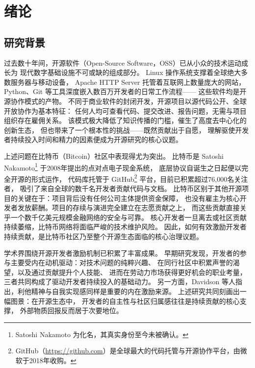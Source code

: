 \documentclass[
    type = master, %
    degree = professional,        %
    decl-page,  %
    twoside,                %
    fontset = fandol %
  ]{njuthesis}
\begin{document}
\tableofcontents
\listoffigures
\listoftables

\mainmatter

\chapter{绪论}

\section{研究背景}

过去数十年间，开源软件（Open-Source Software，OSS）已从小众的技术运动成长为
现代数字基础设施不可或缺的组成部分\cite{lerner2002simple,chen2021opensource}。
Linux 操作系统支撑着全球绝大多数服务器与移动设备，
Apache HTTP Server 托管着互联网上数量庞大的网站，
Python、Git 等工具深度嵌入数百万开发者的日常工作流程——
这些软件均是开源协作模式的产物\cite{lakhani2003open}。
不同于商业软件的封闭开发，开源项目以源代码公开、全球开放协作为基本特征：
任何人均可查看代码、提交改进、报告问题，无需与项目组织存在雇佣关系。
该模式极大降低了知识传播的门槛，催生了高度去中心化的创新生态，
但也带来了一个根本性的挑战——既然贡献出于自愿，
理解驱使开发者持续投入时间和精力的因素便成为开源研究的核心议题。

上述问题在比特币（Bitcoin）社区中表现得尤为突出。
比特币是 Satoshi Nakamoto\footnote{Satoshi Nakamoto 为化名，其真实身份至今未被确认。} 于2008年提出的点对点电子现金系统\cite{nakamoto2008bitcoin,cheng2024bitcoin}，
底层协议自诞生之日起便以完全开源的形式运作，
代码库托管于 GitHub\footnote{GitHub（\url{https://github.com}）是全球最大的代码托管与开源协作平台，由微软于2018年收购。} 平台，目前已积累超过76,000名关注者，
吸引了来自全球的数千名开发者贡献代码与文档。
比特币区别于其他开源项目的关键在于：项目背后没有任何公司主体提供资金保障，
也没有雇主为核心开发者发放薪酬。项目的存续与演进完全建立在志愿贡献之上，
而这些贡献直接关乎一个数千亿美元规模金融网络的安全与可靠。
核心开发者一旦离去或社区贡献持续萎缩，比特币网络将面临严峻的技术维护风险。
因此，如何有效激励开发者持续贡献，是比特币社区乃至整个开源生态面临的核心治理议题。

学术界围绕开源开发者激励机制已积累了丰富成果。
早期研究发现，开发者的参与主要受内在动机驱动：对技术问题的纯粹兴趣\cite{shah2006motivation}、
在同行社区中积累声誉的渴望\cite{lerner2002simple}，以及通过贡献提升个人技能、
进而在劳动力市场获得更好机会的职业考量\cite{fang2009understanding}，
三者共同构成了驱动开发者持续投入的基础动力。
另一方面，Davidson 等人\cite{davidson2014older}指出，利他精神与自我实现感同样是重要的内在激励来源。
上述研究共同刻画出一幅图景：在开源生态中，
开发者的自主性与社区归属感往往是持续贡献的核心支撑，
外部物质回报反而居于次要地位。
\end{document}
